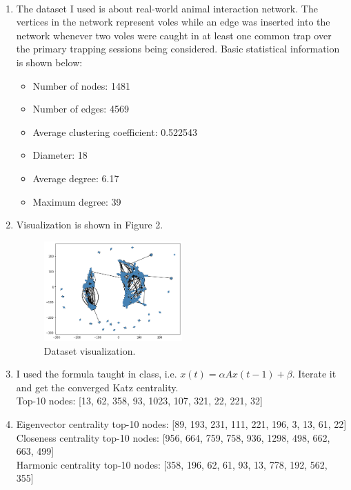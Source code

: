 \documentclass[12pt]{article}
\newcommand {\bsolution}{\noindent {\em Solution:} \ }
\begin{document}
\bsolution
\begin{enumerate}[label=(\alph*)]
	\item The dataset I used is about real-world animal interaction network\cite{nr-aaai15}. The vertices in the network represent voles while an edge was inserted into the network whenever two voles were caught in at least one common trap over the primary trapping sessions being considered. Basic statistical information is shown below:
	\begin{itemize}
		\item Number of nodes: 1481
		\item Number of edges: 4569
		\item Average clustering coefficient: 0.522543
		\item Diameter: 18
		\item Average degree: 6.17
		\item Maximum degree: 39
	\end{itemize}
	\item Visualization is shown in Figure 2.
	\begin{figure}[h]
		\centering
		\includegraphics[width=0.5\textwidth]{fig-prob2b.png}
		\caption{Dataset visualization.}
		\label{HW2_2}
	\end{figure}
	\item I used the formula taught in class, i.e. $x(t)=\alpha Ax(t-1)+\beta$. Iterate it and get the converged Katz centrality.\\[1em]
	Top-10 nodes: [13, 62, 358, 93, 1023, 107, 321, 22, 221, 32]
	\item Eigenvector centrality top-10 nodes: [89, 193, 231, 111, 221, 196, 3, 13, 61, 22]\\[1em]
		  Closeness centrality top-10 nodes: [956, 664, 759, 758, 936, 1298, 498, 662, 663, 499]\\[1em]
		  Harmonic centrality top-10 nodes: [358, 196, 62, 61, 93, 13, 778, 192, 562, 355]\\[1em]

\end{enumerate}
\end{document}
